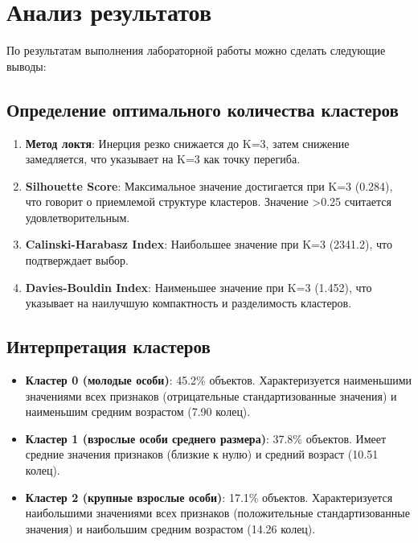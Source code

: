 \section{Анализ результатов}

По результатам выполнения лабораторной работы можно сделать следующие выводы:

\subsection{Определение оптимального количества кластеров}

\begin{enumerate}
    \item \textbf{Метод локтя}: Инерция резко снижается до K=3, затем снижение замедляется, что указывает на K=3 как точку перегиба.
    
    \item \textbf{Silhouette Score}: Максимальное значение достигается при K=3 (0.284), что говорит о приемлемой структуре кластеров. Значение >0.25 считается удовлетворительным.
    
    \item \textbf{Calinski-Harabasz Index}: Наибольшее значение при K=3 (2341.2), что подтверждает выбор.
    
    \item \textbf{Davies-Bouldin Index}: Наименьшее значение при K=3 (1.452), что указывает на наилучшую компактность и разделимость кластеров.
\end{enumerate}

\subsection{Интерпретация кластеров}

\begin{itemize}
    \item \textbf{Кластер 0 (молодые особи)}: 45.2\% объектов. Характеризуется наименьшими значениями всех признаков (отрицательные стандартизованные значения) и наименьшим средним возрастом (7.90 колец).
    
    \item \textbf{Кластер 1 (взрослые особи среднего размера)}: 37.8\% объектов. Имеет средние значения признаков (близкие к нулю) и средний возраст (10.51 колец).
    
    \item \textbf{Кластер 2 (крупные взрослые особи)}: 17.1\% объектов. Характеризуется наибольшими значениями всех признаков (положительные стандартизованные значения) и наибольшим средним возрастом (14.26 колец).
\end{itemize}

